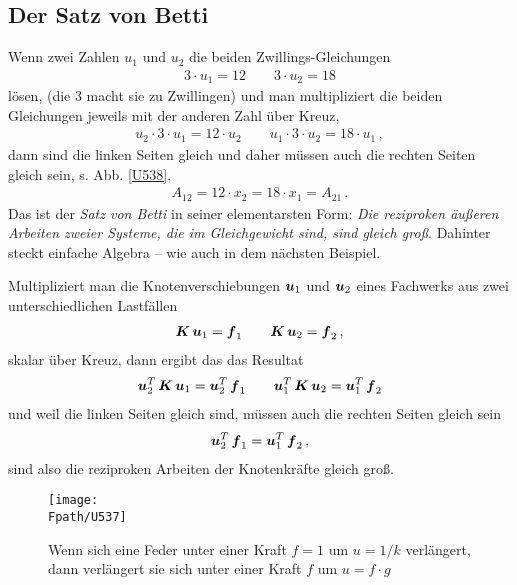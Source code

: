 {{%
{\textcolor{sectionTitleBlue}{\subsection{{Der Satz von Betti}}}
Wenn zwei Zahlen $u_1 $ und $u_2 $ die beiden Zwillings-Gleichungen
\begin{align} \label{Eq44}
3\cdot u_1 = 12 \qquad 3\cdot u_2 = 18
\end{align}
l\"{o}sen, (die 3 macht sie zu Zwillingen) und man multipliziert die beiden Gleichungen jeweils mit der anderen Zahl \glq \"{u}ber Kreuz\grq,
\begin{align}
u_2 \cdot 3\cdot u_1 = 12\cdot u_2 \qquad u_1\cdot 3\cdot u_2 = 18\cdot u_1\,,
\end{align}
dann sind die linken Seiten gleich und daher m\"{u}ssen auch die rechten Seiten gleich sein, s. Abb. \ref{U538},
\begin{align}
A_{12} = 12 \cdot x_2= 18 \cdot x_1 = A_{21}\,.
\end{align}
Das ist der {\em Satz von Betti\/} in seiner elementarsten Form:  {\em Die reziproken \"{a}u{\ss}eren Arbeiten zweier Systeme, die im Gleichgewicht sind, sind gleich gro{\ss}\/}. Dahinter steckt einfache Algebra -- wie auch in dem n\"{a}chsten Beispiel.

Multipliziert man die Knotenverschiebungen $\mbox{\boldmath $u$}_1$ und $\mbox{\boldmath $u$}_2$ eines Fachwerks aus zwei unterschiedlichen Lastf\"{a}llen
\begin{align}
\mbox{\boldmath $K$}\,\mbox{\boldmath $u$}_1 = \mbox{\boldmath $f$}_1 \qquad \mbox{\boldmath $K$}\,\mbox{\boldmath $u$}_2 = \mbox{\boldmath $f$}_2\,,
\end{align}
skalar \glq \"{u}ber Kreuz\grq{}, dann ergibt das das Resultat
\begin{align}
\mbox{\boldmath $u$}_2^T\,\mbox{\boldmath $K$}\,\mbox{\boldmath $u$}_1 = \mbox{\boldmath $u$}_2^T\,\mbox{\boldmath $f$}_1  \qquad \mbox{\boldmath $u$}_1^T\,\mbox{\boldmath $K$}\,\mbox{\boldmath $u$}_2  = \mbox{\boldmath $u$}_1^T\,\mbox{\boldmath $f$}_2
\end{align}
und weil die linken Seiten gleich sind, m\"{u}ssen auch die rechten Seiten gleich sein
\begin{align}
\mbox{\boldmath $u$}_2^T\,\mbox{\boldmath $f$}_1   = \mbox{\boldmath $u$}_1^T\,\mbox{\boldmath $f$}_2\,,
\end{align}
sind also die reziproken Arbeiten der Knotenkr\"{a}fte gleich gro{\ss}.

\begin{figure}[tbp]
\centering
\if {} \sidecaption \fi
\texttt{[image: \\Fpath/U537]}
\caption{Wenn sich eine Feder unter einer Kraft $f = 1 $ um $u = 1/k$ verl\"{a}ngert, dann verl\"{a}ngert sie sich  unter einer Kraft $f $ um $u = f \cdot g$} \label{U537}
%
\end{figure}%

}}}
